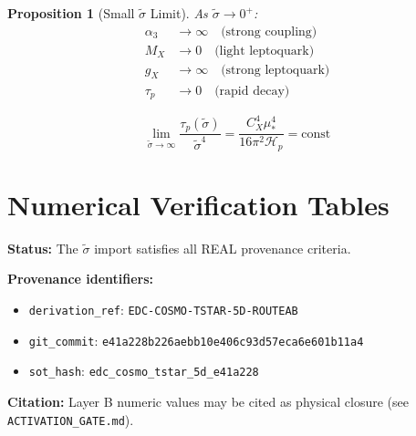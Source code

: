 \documentclass[11pt,letterpaper]{article}
\newtheorem{proposition}[theorem]{Proposition}
\newcommand{\st}{\tilde{\sigma}}
\newcommand{\Hp}{\mathcal{H}_p}
\begin{document}
\begin{proposition}[Small $\st$ Limit]
\label{prop:small-sigma}
As $\st \to 0^+$:
\begin{align}
\alpha_3 &\to \infty \quad \text{(strong coupling)} \label{eq:lim-alpha3-small} \\
M_X &\to 0 \quad \text{(light leptoquark)} \label{eq:lim-mx-small} \\
g_X &\to \infty \quad \text{(strong leptoquark)} \label{eq:lim-gx-small} \\
\tau_p &\to 0 \quad \text{(rapid decay)} \label{eq:lim-taup-small}
\end{align}
\end{proposition}

\begin{equation}
\lim_{\st \to \infty} \frac{\tau_p(\st)}{\st^4} = \frac{C_X^4 \mu_*^4}{16\pi^2 \Hp} = \text{const}
\label{eq:asymptotic-taup}
\end{equation}

\section{Numerical Verification Tables}
\label{app:numerical}

\begin{tcolorbox}[colback=green!10!white,colframe=green!50!black,title=\textbf{REAL MODE --- PROVENANCE SEALED}]
\textbf{Status:} The $\tilde{\sigma}$ import satisfies all REAL provenance criteria.

\textbf{Provenance identifiers:}
\begin{itemize}
  \item \texttt{derivation\_ref}: \texttt{EDC-COSMO-TSTAR-5D-ROUTEAB}
  \item \texttt{git\_commit}: \texttt{e41a228b226aebb10e406c93d57eca6e601b11a4}
  \item \texttt{sot\_hash}: \texttt{edc\_cosmo\_tstar\_5d\_e41a228}
\end{itemize}

\textbf{Citation:} Layer B numeric values may be cited as physical closure (see \texttt{ACTIVATION\_GATE.md}).
\end{tcolorbox}
\end{document}
